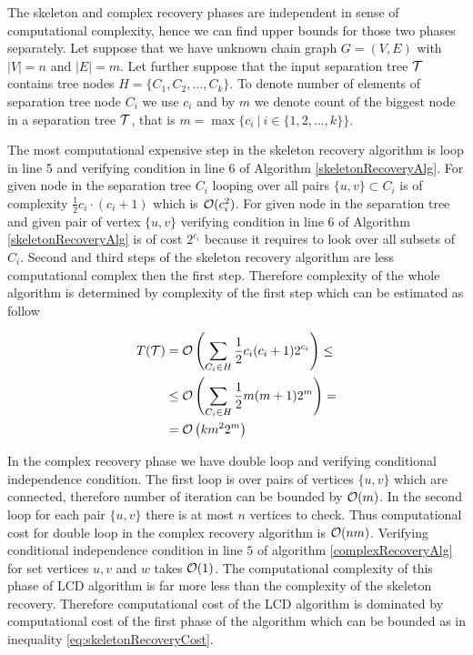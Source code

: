 %
%



The skeleton and complex recovery phases are independent in sense of computational complexity, hence we can
find upper bounds for those two phases separately. 
Let suppose that we have unknown chain graph 
$G = (V, E)$ with $|V| = n$ and $|E| = m$. Let further suppose that the input separation tree $\mathcal{T}$ contains 
tree nodes
$H = \{ C_1, C_2, \dots, C_k \}$. To denote number of elements of separation tree node $C_i$ we use $c_i$ and by
$m$ we denote count of the biggest node in a separation tree $\mathcal{T}$, that is 
$m = \max \{ c_i \ | \ i \in \{1, 2, \dots, k \} \}$.

The most computational expensive step in the skeleton recovery algorithm is loop in line 5 and verifying 
condition in line 6 of Algorithm \ref{skeletonRecoveryAlg}. For given node in the separation tree $C_i$ looping over
all pairs $\{u, v\} \subset C_i$ is of complexity $\frac{1}{2} c_i \cdot (c_i + 1)$ which is $\mathcal{O}(c_i^2)$. For given node in the separation
tree and given pair of vertex $\{u, v\}$ verifying condition in line 6 of Algorithm \ref{skeletonRecoveryAlg} is of
cost $2^{c_i}$ because it requires to look over all subsets of $C_i$. Second and third steps of the skeleton
recovery algorithm are less computational complex then the first step. Therefore complexity of the whole algorithm 
is determined by complexity of the first step which can be estimated as follow


\begin{equation} \label{eq:skeletonRecoveryCost}
\begin{split}
	T(\mathcal{T}) & = \mathcal{O} \left( \sum_{C_i \in H} \frac{1}{2} c_i (c_i + 1) 2^{c_i} \right)  \le  \\
	&  \le \mathcal{O} \left( \sum_{C_i \in H} \frac{1}{2}m(m+1)2^{m} \right) =  \\
	& = \mathcal{O} \left( km^2 2^m \right)
\end{split}
\end{equation}

In the complex recovery phase we have double loop and verifying conditional independence condition.
The first loop is over pairs of vertices $\{ u, v \}$ which are connected, therefore number of iteration
can be bounded by $\mathcal{O}(m)$. In the second loop for each pair $\{ u, v \}$ there is at most $n$ vertices to check.
Thus computational cost for double loop in the complex recovery algorithm is $\mathcal{O}(nm)$.
Verifying conditional independence condition in line $5$ of algorithm \ref{complexRecoveryAlg} for
set vertices $u, v$ and $w$ takes $\mathcal{O}(1)$. The computational complexity of this phase of LCD algorithm
is far more less than the complexity of the skeleton recovery. Therefore computational cost of the LCD algorithm
is dominated by computational cost of the first phase of the algorithm which can be bounded as in inequality \ref{eq:skeletonRecoveryCost}.






